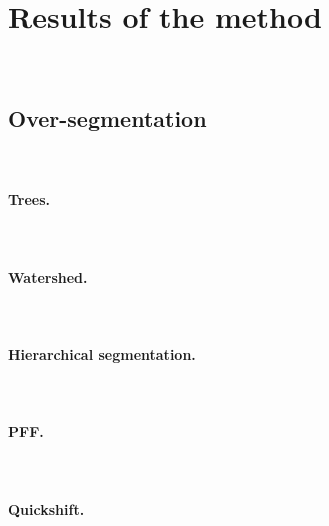 \section{Results of the method}~\vspace*{-1cm}
\subsection{Over-segmentation}~\vspace*{-1cm}
\paragraph{Trees. \\}~\vspace*{-1cm}
~\vspace*{-1cm}
~\vspace*{-1cm}

\paragraph{Watershed. \\}~\vspace*{-1cm}
~\vspace*{-1cm}
~\vspace*{-1cm}

\paragraph{Hierarchical segmentation. \\}~\vspace*{-1cm}
~\vspace*{-1cm}
~\vspace*{-1cm}

\paragraph{PFF. \\}~\vspace*{-1cm}
~\vspace*{-1cm}
~\vspace*{-1cm}

\paragraph{Quickshift. \\}~\vspace*{-1cm}
~\vspace*{-1cm}
~\vspace*{-1cm}

